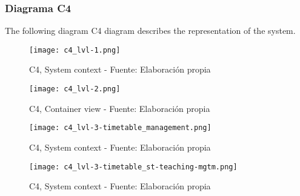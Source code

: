 \subsubsection{Diagrama C4}
The following diagram C4 diagram describes the representation of the system.
\begin{figure}[H]
    \centering
    \texttt{[image: c4\_lvl-1.png]}
    \caption{C4, System context - Fuente: Elaboración propia}
    \label{fig:c4_lvl_1}
\end{figure}
\begin{figure}[H]
    \centering
    \texttt{[image: c4\_lvl-2.png]}
    \caption{C4, Container view - Fuente: Elaboración propia}
    \label{fig:c4_lvl_2}
\end{figure}
\begin{figure}[H]
    \centering
    \texttt{[image: c4\_lvl-3-timetable\_management.png]}
    \caption{C4, System context - Fuente: Elaboración propia}
    \label{fig:c4_lvl_3a}
\end{figure}
\begin{figure}[H]
    \centering
    \texttt{[image: c4\_lvl-3-timetable\_st-teaching-mgtm.png]}
    \caption{C4, System context - Fuente: Elaboración propia}
    \label{fig:c4_lvl_3b}
\end{figure}
